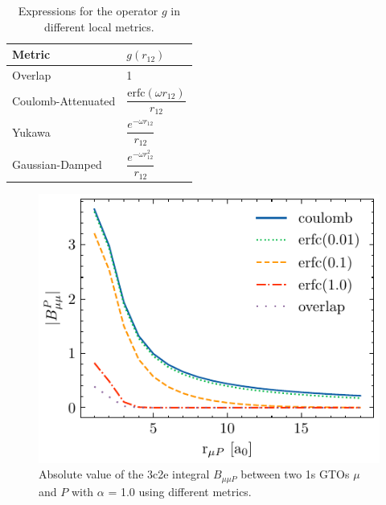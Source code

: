 \begin{table}
\centering
\begin{tabular}{ll}
\hline
Metric & $g(r_{12})$ \\ \hline
\multirow{2}{*}{Overlap \cite{Bae1973}} & \multirow{2}{*}{1} \\ & \\
\multirow{3}{*}{Coulomb-Attenuated \cite{Jun2005}} & \multirow{3}{*}{$\dfrac{\mathrm{erfc}(\omega r_{12})}{r_{12}}$} \\ & \\ & \\
\multirow{3}{*}{Yukawa \cite{Gil2005}} & \multirow{3}{*}{$\dfrac{e^{-\omega r_{12}}}{r_{12}}$} \\ & \\ & \\
\multirow{3}{*}{Gaussian-Damped \cite{Rei2008}} & \multirow{3}{*}{$\dfrac{e^{-\omega r_{12}^2}}{r_{12}}$} \\ & \\ & \\ \hline
\end{tabular}
\caption{Expressions for the operator $g$ in different local metrics.}
\label{tab:DFMETRICS}
\end{table}

\begin{figure}
\centering
\includegraphics[scale=1.0]{Pics/ldf.pdf}
\caption{Absolute value of the 3c2e integral $B_{\mu\mu P}$ between two 1s GTOs $\mu$ and $P$ with $\alpha$ = 1.0 using different metrics.}
\label{fig:DFMETRICS}
\end{figure}

